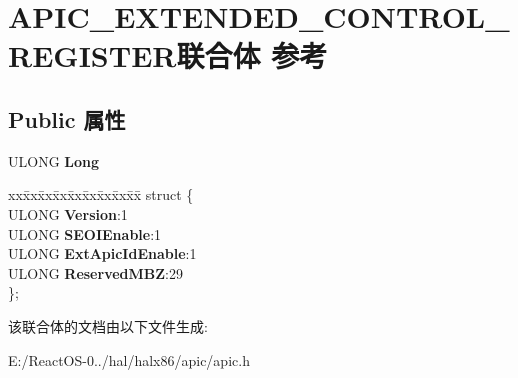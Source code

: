 \hypertarget{union_a_p_i_c___e_x_t_e_n_d_e_d___c_o_n_t_r_o_l___r_e_g_i_s_t_e_r}{}\section{A\+P\+I\+C\+\_\+\+E\+X\+T\+E\+N\+D\+E\+D\+\_\+\+C\+O\+N\+T\+R\+O\+L\+\_\+\+R\+E\+G\+I\+S\+T\+E\+R联合体 参考}
\label{union_a_p_i_c___e_x_t_e_n_d_e_d___c_o_n_t_r_o_l___r_e_g_i_s_t_e_r}
\subsection*{Public 属性}
\begin{DoxyCompactItemize}
\item 
\mbox{\label{union_a_p_i_c___e_x_t_e_n_d_e_d___c_o_n_t_r_o_l___r_e_g_i_s_t_e_r_afbc90bfc1513768a5a7aac7e3b4ea6cc}} 
U\+L\+O\+NG {\bfseries Long}
\item 
\mbox{\label{union_a_p_i_c___e_x_t_e_n_d_e_d___c_o_n_t_r_o_l___r_e_g_i_s_t_e_r_ae7ed63a670c5e1fe9a941da74f2ca89c}} 
\begin{tabbing}
xx\=xx\=xx\=xx\=xx\=xx\=xx\=xx\=xx\=\kill
struct \{\\
\>ULONG {\bfseries Version}:1\\
\>ULONG {\bfseries SEOIEnable}:1\\
\>ULONG {\bfseries ExtApicIdEnable}:1\\
\>ULONG {\bfseries ReservedMBZ}:29\\
\}; \\

\end{tabbing}\end{DoxyCompactItemize}


该联合体的文档由以下文件生成\+:\begin{DoxyCompactItemize}
\item 
E\+:/\+React\+O\+S-\/0../hal/halx86/apic/apic.\+h\end{DoxyCompactItemize}
